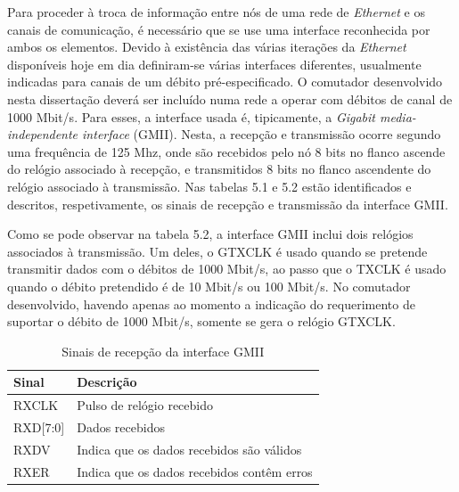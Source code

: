 Para proceder à troca de informação entre nós de uma rede de \textit{Ethernet} e os canais de comunicação, é necessário que se use uma interface reconhecida por ambos os elementos. Devido à existência das várias iterações da \textit{Ethernet} disponíveis hoje em dia definiram-se várias interfaces diferentes, usualmente indicadas para canais de um débito pré-especificado. O comutador desenvolvido nesta dissertação deverá ser incluído numa rede a operar com débitos de canal de 1000 Mbit/s. Para esses, a interface usada é, tipicamente, a \textit{Gigabit media-independente interface} (GMII). Nesta, a recepção e transmissão ocorre segundo uma frequência de 125 Mhz, onde são recebidos pelo nó 8 bits no flanco ascende do relógio associado à recepção, e transmitidos 8 bits no flanco ascendente do relógio associado à transmissão.
Nas tabelas 5.1 e 5.2 estão identificados e descritos, respetivamente, os sinais de recepção e transmissão da interface GMII.\par Como se pode observar na tabela 5.2, a interface GMII inclui dois relógios associados à transmissão. Um deles, o GTXCLK é usado quando se pretende transmitir dados com o débitos de 1000 Mbit/s, ao passo que o TXCLK é usado quando o débito pretendido é de 10 Mbit/s ou 100 Mbit/s. No comutador desenvolvido, havendo apenas ao momento a indicação do requerimento de suportar o débito de 1000 Mbit/s, somente se gera o relógio GTXCLK.


\begin{table}[h]
\begin{center}
\begin{tabular}{|l|l|}

    \hline
    Sinal &  Descrição  \\
    \hline
    RXCLK &  Pulso de relógio recebido  \\
    \hline
    RXD[7:0] & Dados recebidos \\
    \hline
    RXDV & Indica que os dados recebidos são válidos \\
    \hline
    RXER & Indica que os dados recebidos contêm erros \\
    \hline
    
\end{tabular}
\end{center}
\caption{Sinais de recepção da interface GMII}\label{Sinais de recepção do GMII}
\end{table} 

